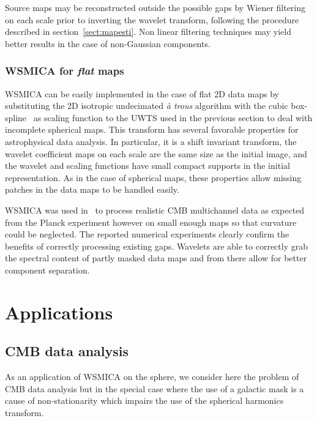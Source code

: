 Source maps may be reconstructed outside the possible gaps by Wiener filtering on each scale prior to inverting the wavelet transform, following 
the procedure described in section~\ref{sect:mapesti}. Non linear filtering techniques may yield better results in the case of non-Gaussian components. 

\subsubsection{WSMICA for \emph{flat} maps}

WSMICA can be easily implemented in the case of flat 2D data maps by substituting the 2D isotropic undecimated \emph{\`a trous} algorithm with 
the cubic box-spline~\cite{starck:book02} as scaling function to the UWTS used in the previous section to deal with incomplete spherical maps.
This transform has several favorable properties for astrophysical data analysis. In particular, it is a shift invariant transform, the wavelet 
coefficient maps on each scale are the same size as the initial image, and the wavelet and scaling functions have small compact supports in the 
initial representation. As in the case of spherical maps, these properties allow  missing patches in the data maps to be handled easily.

WSMICA was used in~\cite{starck:yassir05} to process realistic CMB multichannel data as expected from the Planck experiment however on small enough 
maps so that curvature could be neglected. The reported numerical experiments clearly confirm the benefits of correctly processing existing gaps. 
Wavelets are able to correctly grab the spectral content of partly masked data maps and from there allow for better component separation.  

\section{Applications}

\subsection{CMB data analysis}\label{sect:NUMEXP}

As an application of WSMICA on the sphere, we consider here the problem of CMB data analysis but in the special case where the use of a galactic 
mask is a cause of non-stationarity which impairs the use of the spherical harmonics transform. 

